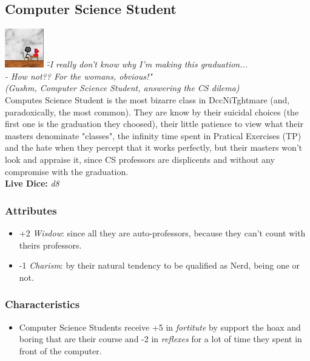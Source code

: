 \documentclass[ letterpaper,12pt]{article}
\begin{document}
\subsection{Computer Science Student}
\includegraphics{../data/classes/Img/dcc.png}
{\it 
\"-I really don't know why I'm making this graduation...\\
- How not?? For the womans, obvious!"\\
(Gushm, Computer Science Student, answering the CS dilema)}\\

Computes Science Student is the most bizarre class in DccNiTghtmare (and,
paradoxically, the most common). They are know by their suicidal choices (the
first one is the graduation they choosed), their little patience to view what
their masters denominate "classes", the infinity time spent in Pratical
Exercises (TP) and the hate when they percept that it works perfectly, but their
masters won't look and appraise it, since CS professors are displicents and
without any compromise with the graduation.\\

{\bf Live Dice:} {\it d8}

\subsubsection{Attributes}
\begin{itemize}
\item{+2 {\it Wisdow}: since all they are auto-professors, because they can't count with theirs professors.}
\item{-1 {\it Charism}: by their natural tendency to be qualified as Nerd, being one or not.}
\end{itemize}

\subsubsection{Characteristics}
\begin{itemize}
\item{Computer Science Students receive +5 in {\it fortitute} by support the hoax and boring that are their course and -2 in {\it reflexes} for a lot of time they spent in front of the computer.}
\end{itemize}
\end{document}
